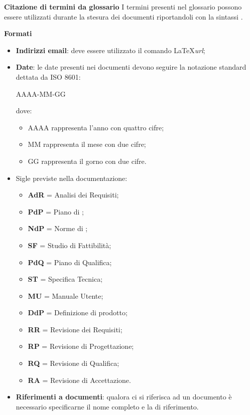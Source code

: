 \textbf{Citazione di termini da glossario}
I termini presenti nel glossario possono essere utilizzati durante la stesura dei documenti riportandoli con la sintassi .


\textbf{Formati} 
\begin{itemize}
\item \textbf{Indirizzi email}: deve essere utilizzato il comando \LaTeX \textit{url};
\item \textbf{Date}: le date presenti nei documenti devono seguire la notazione standard dettata da ISO 8601:

  \begin{center}
    AAAA-MM-GG
  \end{center}
  
  dove:
  \begin{itemize}
  \item AAAA rappresenta l'anno con quattro cifre;
  \item MM rappresenta il mese con due cifre;
  \item GG rappresenta il gorno con due cifre.
  \end{itemize}
\item Sigle previste nella documentazione:
  \begin{itemize}
  \item \textbf{AdR} = Analisi dei Requisiti;
  \item \textbf{PdP} = Piano di ;
  \item \textbf{NdP} = Norme di ;
  \item \textbf{SF} = Studio di Fattibilità;
  \item \textbf{PdQ} = Piano di Qualifica;
  \item \textbf{ST} = Specifica Tecnica;
  \item \textbf{MU} = Manuale Utente;
  \item \textbf{DdP} = Definizione di prodotto;
  \item \textbf{RR} = Revisione dei Requisiti;
  \item \textbf{RP} = Revisione di Progettazione;
  \item \textbf{RQ} = Revisione di Qualifica;
  \item \textbf{RA} = Revisione di Accettazione.
  \end{itemize}
\item \textbf{Riferimenti a documenti}: qualora ci si riferisca ad un documento è necessario specificarne il nome completo e la  di riferimento.
\end{itemize}



